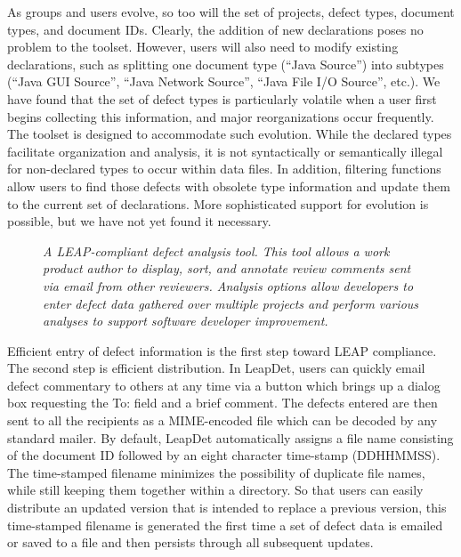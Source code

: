 As groups and users evolve, so too will the set of projects, defect types,
document types, and document IDs. Clearly, the addition of new declarations
poses no problem to the toolset. However, users will also need to modify
existing declarations, such as splitting one document type (``Java
Source'') into subtypes (``Java GUI Source'', ``Java Network Source'',
``Java File I/O Source'', etc.).  We have found that the set of defect types is
particularly volatile when a user first begins collecting this information,
and major reorganizations occur frequently.  The toolset is designed
to accommodate such evolution.  While the declared types facilitate
organization and analysis, it is not syntactically or semantically illegal
for non-declared types to occur within data files. In addition, filtering
functions allow users to find those defects with obsolete type information
and update them to the current set of declarations.  More sophisticated
support for evolution is possible, but we have not yet found it necessary.


\begin{figure*}[t]
{\centerline {}}
 \caption{{\em A LEAP-compliant defect analysis tool. This tool allows
 a work product author to display, sort, and annotate review comments sent via email from
 other reviewers. Analysis options allow developers to enter defect data
 gathered over multiple projects and perform various analyses to support
 software developer improvement.}}
 \label{fig:leapdat}
\end{figure*}

Efficient entry of defect information is the first step toward LEAP
compliance. The second step is efficient distribution.  In LeapDet, users
can quickly email defect commentary to others at any time via a button
which brings up a dialog box requesting the To: field and a brief comment.
The defects entered are then sent to all the recipients as a MIME-encoded
file which can be decoded by any standard mailer.  By default, LeapDet
automatically assigns a file name consisting of the document ID followed by
an eight character time-stamp (DDHHMMSS).  The time-stamped filename
minimizes the possibility of duplicate file names, while still keeping them
together within a directory.  So that users can easily distribute an
updated version that is intended to replace a previous version, this
time-stamped filename is generated the first time a set of defect data is
emailed or saved to a file and then persists through all subsequent
updates.

